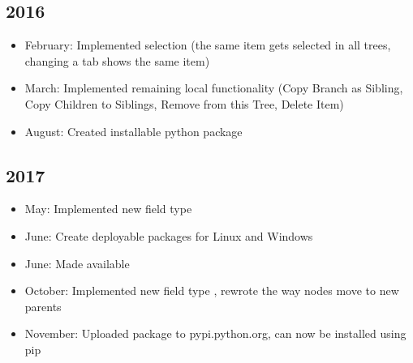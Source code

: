 \documentclass[letterpaper,10pt,english]{sphinxmanual}
\begin{document}
\subsection{2016}
\label{\detokenize{releases:id2}}\begin{itemize}
\item {} 
\sphinxAtStartPar
February: Implemented selection (the same item gets selected in all trees, changing a tab shows the same item)

\item {} 
\sphinxAtStartPar
March: Implemented remaining local functionality (Copy Branch as Sibling, Copy Children to Siblings, Remove from this Tree, Delete Item)

\item {} 
\sphinxAtStartPar
August: Created installable python package

\end{itemize}


\subsection{2017}
\label{\detokenize{releases:id3}}\begin{itemize}
\item {} 
\sphinxAtStartPar
May: Implemented new field type 

\item {} 
\sphinxAtStartPar
June: Create deployable packages for Linux and Windows

\item {} 
\sphinxAtStartPar
June: Made  available

\item {} 
\sphinxAtStartPar
October: Implemented new field type , re\sphinxhyphen{}wrote the way nodes move to new parents

\item {} 
\sphinxAtStartPar
November: Uploaded package to pypi.python.org,  can now be installed using pip

\end{itemize}
\end{document}
